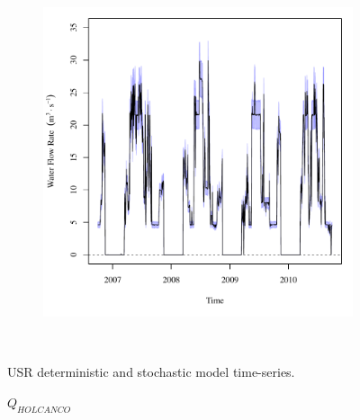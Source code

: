 \begin{linenumbers}
\begin{landscape}
\begin{figure}
\begin{subfigure}{0.7\textwidth}
		\end{subfigure}%
		\begin{subfigure}{0.7\textwidth}
			\centering
			\includegraphics[width=\textwidth]{"Figures/Results_USR/Stochastic/Q FLY"}
		\end{subfigure}\\
		\caption{USR deterministic and stochastic model time-series.}
	\end{figure}
\end{landscape}
\subfiguremid
\begin{landscape}
	\begin{figure}
		\centering
		$ Q_{HOLCANCO} $
		\begin{subfigure}{0.7\textwidth}
			\centering

\end{subfigure}
\end{figure}
\end{landscape}
\end{linenumbers}
